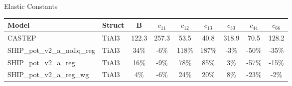 \documentclass[preview]{standalone}
\begin{document}
\begin{center}
\textnormal{Elastic Constants} \\
\vspace{2mm}
\begin{tabular}{ l l c c c c c c c } \toprule 
Model & Struct & B & $c_{11}$ & $c_{12}$ & $c_{13}$ & $c_{33}$ & $c_{44}$ & $c_{66}$\\ \midrule 
CASTEP & TiAl3 & 122.3 & 257.3 & 53.5 & 40.8 & 318.9 & 70.5 & 128.2\\ 
SHIP\_pot\_v2\_a\_noliq\_reg & TiAl3 & 34\% & -6\% & 118\% & 187\% & -3\% & -50\% & -35\%\\ 
SHIP\_pot\_v2\_a\_reg & TiAl3 & 16\% & -9\% & 78\% & 85\% & 3\% & -57\% & -15\%\\ 
SHIP\_pot\_v2\_a\_reg\_wg & TiAl3 & 4\% & -6\% & 24\% & 20\% & 8\% & -23\% & -2\%\\ 
\end{tabular} \bigskip 
\end{center}
\end{document}
